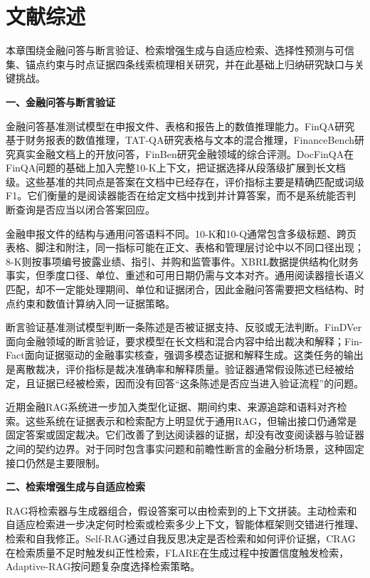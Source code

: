 \chapter{文献综述}
\label{ch:related}

本章围绕金融问答与断言验证、检索增强生成与自适应检索、选择性预测与可信集、锚点约束与时点证据四条线索梳理相关研究，并在此基础上归纳研究缺口与关键挑战。

\noindent\textbf{一、金融问答与断言验证}

金融问答基准测试模型在申报文件、表格和报告上的数值推理能力。FinQA研究基于财务报表的数值推理\citep{chen2021finqa}，TAT-QA研究表格与文本的混合推理\citep{zhu2021tatqa}，FinanceBench研究真实金融文档上的开放问答\citep{islam2023financebench}，FinBen研究金融领域的综合评测\citep{xie2024finben}。DocFinQA在FinQA问题的基础上加入完整10-K上下文，把证据选择从段落级扩展到长文档级\citep{reddy2024docfinqa}。这些基准的共同点是答案在文档中已经存在，评价指标主要是精确匹配或词级F1。它们衡量的是阅读器能否在给定文档中找到并计算答案，而不是系统能否判断查询是否应当以闭合答案回应。

金融申报文件的结构与通用问答语料不同。10-K和10-Q通常包含多级标题、跨页表格、脚注和附注，同一指标可能在正文、表格和管理层讨论中以不同口径出现；8-K则按事项编号披露业绩、指引、并购和监管事件。XBRL数据提供结构化财务事实，但季度口径、单位、重述和可用日期仍需与文本对齐。通用阅读器擅长语义匹配，却不一定能处理期间、单位和证据闭合，因此金融问答需要把文档结构、时点约束和数值计算纳入同一证据策略。

断言验证基准测试模型判断一条陈述是否被证据支持、反驳或无法判断。FinDVer面向金融领域的断言验证，要求模型在长文档和混合内容中给出裁决和解释\citep{zhao2024findver}；Fin-Fact面向证据驱动的金融事实核查，强调多模态证据和解释生成\citep{rangapur2025finfact}。这类任务的输出是离散裁决，评价指标是裁决准确率和解释质量。验证器通常假设陈述已经被给定，且证据已经被检索，因而没有回答“这条陈述是否应当进入验证流程”的问题。

近期金融RAG系统进一步加入类型化证据、期间约束、来源追踪和语料对齐检索\citep{mansouri2026finrank,jiang2026finrate,chen2026hcrag,chi2026finsagent,zhou2026fincards}。这些系统在证据表示和检索配方上明显优于通用RAG，但输出接口仍通常是固定答案或固定裁决。它们改善了到达阅读器的证据，却没有改变阅读器与验证器之间的契约边界。对于同时包含事实问题和前瞻性断言的金融分析场景，这种固定接口仍然是主要限制。

\noindent\textbf{二、检索增强生成与自适应检索}

RAG将检索器与生成器组合，假设答案可以由检索到的上下文拼装\citep{lewis2020rag}。主动检索和自适应检索进一步决定何时检索或检索多少上下文\citep{jiang2023flare,jeong2024adaptiverag}，智能体框架则交错进行推理、检索和自我修正\citep{yao2023react,shinn2023reflexion}。Self-RAG通过自我反思决定是否检索和如何评价证据\citep{asai2024selfrag}，CRAG在检索质量不足时触发纠正性检索\citep{yan2024crag}，FLARE在生成过程中按置信度触发检索\citep{jiang2023flare}，Adaptive-RAG按问题复杂度选择检索策略\citep{jeong2024adaptiverag}。

